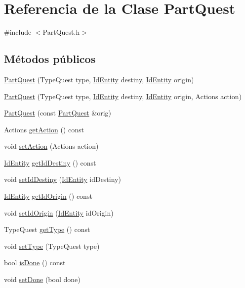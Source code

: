 \hypertarget{classPartQuest}{}\section{Referencia de la Clase Part\+Quest}
\label{classPartQuest}


{\ttfamily \#include $<$Part\+Quest.\+h$>$}

\subsection*{Métodos públicos}
\begin{DoxyCompactItemize}
\item 
\hyperlink{classPartQuest_a34beee72ffac9011bfe9297a24206734}{Part\+Quest} (Type\+Quest type, \hyperlink{classIdEntity}{Id\+Entity} destiny, \hyperlink{classIdEntity}{Id\+Entity} origin)
\item 
\hyperlink{classPartQuest_a95ff917dffd83bb251768845bd29d77f}{Part\+Quest} (Type\+Quest type, \hyperlink{classIdEntity}{Id\+Entity} destiny, \hyperlink{classIdEntity}{Id\+Entity} origin, Actions action)
\item 
\hyperlink{classPartQuest_a3c9f1f5534fe3873f7369e2c4c1ada6d}{Part\+Quest} (const \hyperlink{classPartQuest}{Part\+Quest} \&orig)
\item 
Actions \hyperlink{classPartQuest_a61047034367ebf891b764725ca2799d2}{get\+Action} () const 
\item 
void \hyperlink{classPartQuest_a27045fe31fafd738ea49457c1f776069}{set\+Action} (Actions action)
\item 
\hyperlink{classIdEntity}{Id\+Entity} \hyperlink{classPartQuest_a470d693e1e86d3705aae19fa1b77d7cf}{get\+Id\+Destiny} () const 
\item 
void \hyperlink{classPartQuest_ac2d0a47c74bfd5cc846e4ceda5547ca5}{set\+Id\+Destiny} (\hyperlink{classIdEntity}{Id\+Entity} id\+Destiny)
\item 
\hyperlink{classIdEntity}{Id\+Entity} \hyperlink{classPartQuest_a04d1b9b8e5a22bf18264981a621d8347}{get\+Id\+Origin} () const 
\item 
void \hyperlink{classPartQuest_ad72064f10d109cb51c62373ce563aa27}{set\+Id\+Origin} (\hyperlink{classIdEntity}{Id\+Entity} id\+Origin)
\item 
Type\+Quest \hyperlink{classPartQuest_a2bbac994710c6dc8b02dde2262d5ffe8}{get\+Type} () const 
\item 
void \hyperlink{classPartQuest_a14c9e56b0feed8a7453d19ed05a9e396}{set\+Type} (Type\+Quest type)
\item 
bool \hyperlink{classPartQuest_a922b2542a3ada799abb237a7f3cae518}{is\+Done} () const 
\item 
void \hyperlink{classPartQuest_adfded17b91e8e73ea8c2b21ea363dac1}{set\+Done} (bool done)
\end{DoxyCompactItemize}


